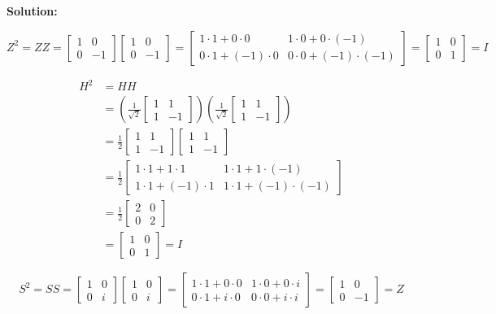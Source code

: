 \documentclass[11pt]{article}
\newenvironment{solution}
{\par\noindent\textbf{Solution:}\par}
{\vspace{1em}}
\begin{document}
\begin{solution}
\[
Z^2 = ZZ = \begin{bmatrix}1&0\\0&-1\end{bmatrix} \begin{bmatrix}1&0\\0&-1\end{bmatrix} = \begin{bmatrix}1 \cdot 1 + 0 \cdot 0&1 \cdot 0 + 0 \cdot (-1)\\0 \cdot 1 + (-1) \cdot 0&0 \cdot 0 + (-1) \cdot (-1)\end{bmatrix} = \begin{bmatrix}1&0\\0&1\end{bmatrix} = \boxed{I}
\]

\[
\begin{aligned}
H^2 &= HH \\
&= \left(\frac{1}{\sqrt{2}}
\begin{bmatrix}
1 & 1\\
1 & -1
\end{bmatrix}\right)
\left(\frac{1}{\sqrt{2}}
\begin{bmatrix}
1 & 1\\
1 & -1
\end{bmatrix}\right) \\
&= \frac{1}{2}
\begin{bmatrix}
1 & 1\\
1 & -1
\end{bmatrix}
\begin{bmatrix}
1 & 1\\
1 & -1
\end{bmatrix} \\
&= \frac{1}{2}
\begin{bmatrix}
1\cdot1 + 1\cdot1 & 1\cdot1 + 1\cdot(-1)\\
1\cdot1 + (-1)\cdot1 & 1\cdot1 + (-1)\cdot(-1)
\end{bmatrix} \\
&= \frac{1}{2}
\begin{bmatrix}
2 & 0\\
0 & 2
\end{bmatrix} \\
&=
\begin{bmatrix}
1 & 0\\
0 & 1
\end{bmatrix}
= \boxed{I}
\end{aligned}
\]

\[
S^2 = SS = \begin{bmatrix}1&0\\0&i\end{bmatrix} \begin{bmatrix}1&0\\0&i\end{bmatrix} = \begin{bmatrix}1 \cdot 1 + 0 \cdot 0&1 \cdot 0 + 0 \cdot i\\0 \cdot 1 + i \cdot 0&0 \cdot 0 + i \cdot i\end{bmatrix} = \begin{bmatrix}1&0\\0&-1\end{bmatrix} = \boxed{Z}
\]


\end{solution}
\end{document}
